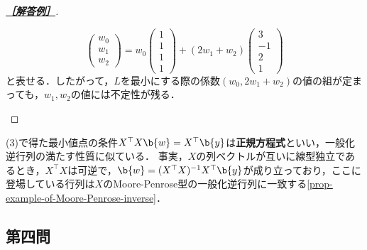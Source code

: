 \documentclass[uplatex,dvipdfmx]{jsarticle}
\begin{document}
\begin{proof}[\textbf{\underline{［解答例］}}]
\begin{enumerate}
\[\begin{pmatrix}
            w_0\\w_1\\w_2
        \end{pmatrix}=w_0 \begin{pmatrix}1\\1\\1\\1\end{pmatrix}+(2w_1+w_2) \begin{pmatrix}3\\-1\\2\\1\end{pmatrix}\]
        と表せる．したがって，$L$を最小にする際の係数$(w_0,2w_1+w_2)$の値の組が定まっても，$w_1,w_2$の値には不定性が残る．
    \end{enumerate}
\end{proof}
\begin{remark*}
    (3)で得た最小値点の条件$X^\top X\b{w}=X^\top\b{y}$は\textbf{正規方程式}といい，一般化逆行列の満たす性質に似ている．
    事実，$X$の列ベクトルが互いに線型独立であるとき，$X^\top X$は可逆で，$\b{w}=(X^\top X)^{-1}X^\top\b{y}$が成り立っており，ここに登場している行列は$X$のMoore-Penrose型の一般化逆行列に一致する\ref{prop-example-of-Moore-Penrose-inverse}．
\end{remark*}

\subsection{第四問}
\end{document}
